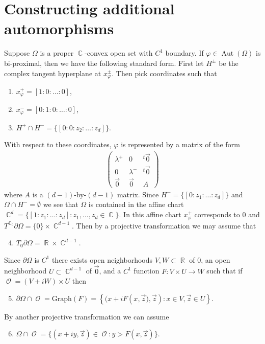 \documentclass[12pt]{amsart}
\theoremstyle{plain}
\theoremstyle{definition}
\theoremstyle{remark}
\begin{document}
\section{Constructing additional automorphisms}\label{sec:constr_auto}

Suppose $\Omega$ is a proper $\operatorname{\mathbb{C}}$-convex open set with $C^1$ boundary. If $\varphi \in \operatorname{Aut}(\Omega)$ is bi-proximal, then we have the following standard form. First let $H^{\pm}$ be the complex tangent hyperplane at $x^{\pm}_\varphi$. Then pick coordinates such that
\begin{enumerate}
\item $x^+_\varphi = [1:0:\dots:0]$,
\item $x^-_\varphi = [0:1:0: \dots :0]$,
\item $H^+ \cap H^- = \{ [0:0:z_2:\dots:z_d]\}$.
\end{enumerate}
With respect to these coordinates, $\varphi$ is represented by a matrix of the form
\begin{align*}
\begin{pmatrix}
\lambda^+ & 0 & ^t\vec{0}\\
0 & \lambda^- & ^t\vec{0} \\
\vec{0} & \vec{0} & A
\end{pmatrix}
\end{align*}
where $A$ is a $(d-1)$-by-$(d-1)$ matrix. Since $H^-=\{[0:z_1:\dots:z_d]\}$ and $\Omega \cap H^- = \emptyset$ we see that $\Omega$ is contained in the affine chart $\operatorname{\mathbb{C}}^d = \{ [1: z_1: \dots : z_d ] : z_1, \dots, z_d \in \operatorname{\mathbb{C}}\}$. In this affine chart $x^+_\varphi$ corresponds to $0$ and $T^\operatorname{\mathbb{C}}_0 \partial \Omega = \{0\} \times \operatorname{\mathbb{C}}^{d-1}$. Then by a projective transformation we may assume that
\begin{enumerate}
\setcounter{enumi}{3}
\item $T_0 \partial \Omega = \operatorname{\mathbb{R}} \times \operatorname{\mathbb{C}}^{d-1}$.
\end{enumerate}
Since $\partial \Omega$ is $C^1$ there exists open neighborhoods $V,W \subset \operatorname{\mathbb{R}}$ of $0$, an open neighborhood $U \subset \operatorname{\mathbb{C}}^{d-1}$ of $\vec{0}$, and a $C^1$ function $F:V \times U \rightarrow W$ such that if $\operatorname{\mathcal{O}} = (V+iW) \times U$ then 
\begin{enumerate}
\setcounter{enumi}{4}
\item $\partial \Omega \cap \operatorname{\mathcal{O}} = \mathrm{Graph}(F)=\left\{ (x+iF\left(x,\vec{z}), \vec{z}\right) : x \in V, \vec{z} \in U\right\}$. 
\end{enumerate}
By another projective transformation we can assume 
\begin{enumerate}
\setcounter{enumi}{5}
\item $\Omega \cap \operatorname{\mathcal{O}} = \{ (x+iy, \vec{z}) \in \operatorname{\mathcal{O}} : y > F(x,\vec{z}) \}$.
\end{enumerate}
\end{document}

